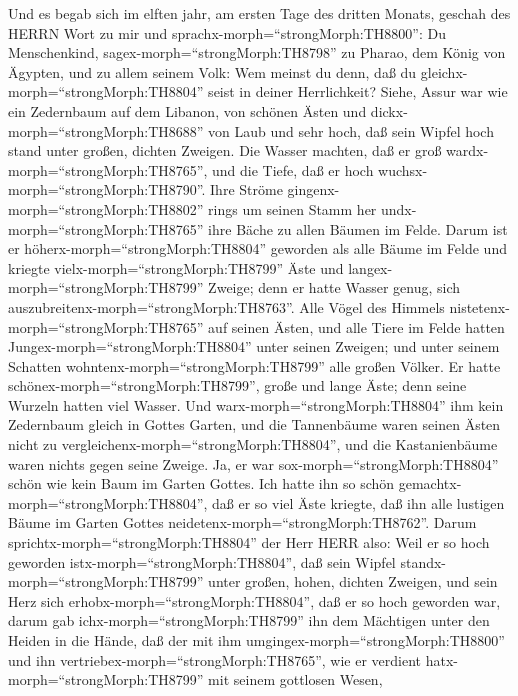  Und es begab sich im elften jahr, am ersten Tage des
dritten Monats, geschah des HERRN Wort zu mir und
sprachx-morph=``strongMorph:TH8800'':  Du Menschenkind,
sagex-morph=``strongMorph:TH8798'' zu Pharao, dem König von Ägypten, und
zu allem seinem Volk: Wem meinst du denn, daß du
gleichx-morph=``strongMorph:TH8804'' seist in deiner Herrlichkeit?
 Siehe, Assur war wie ein Zedernbaum auf dem Libanon, von
schönen Ästen und dickx-morph=``strongMorph:TH8688'' von Laub und sehr
hoch, daß sein Wipfel hoch stand unter großen, dichten Zweigen.
 Die Wasser machten, daß er groß
wardx-morph=``strongMorph:TH8765'', und die Tiefe, daß er hoch
wuchsx-morph=``strongMorph:TH8790''. Ihre Ströme
gingenx-morph=``strongMorph:TH8802'' rings um seinen Stamm her
undx-morph=``strongMorph:TH8765'' ihre Bäche zu allen Bäumen im Felde.
 Darum ist er höherx-morph=``strongMorph:TH8804'' geworden
als alle Bäume im Felde und kriegte vielx-morph=``strongMorph:TH8799''
Äste und langex-morph=``strongMorph:TH8799'' Zweige; denn er hatte
Wasser genug, sich auszubreitenx-morph=``strongMorph:TH8763''.
 Alle Vögel des Himmels
nistetenx-morph=``strongMorph:TH8765'' auf seinen Ästen, und alle Tiere
im Felde hatten Jungex-morph=``strongMorph:TH8804'' unter seinen
Zweigen; und unter seinem Schatten wohntenx-morph=``strongMorph:TH8799''
alle großen Völker.  Er hatte
schönex-morph=``strongMorph:TH8799'', große und lange Äste; denn seine
Wurzeln hatten viel Wasser.  Und
warx-morph=``strongMorph:TH8804'' ihm kein Zedernbaum gleich in Gottes
Garten, und die Tannenbäume waren seinen Ästen nicht zu
vergleichenx-morph=``strongMorph:TH8804'', und die Kastanienbäume waren
nichts gegen seine Zweige. Ja, er war sox-morph=``strongMorph:TH8804''
schön wie kein Baum im Garten Gottes.  Ich hatte ihn so
schön gemachtx-morph=``strongMorph:TH8804'', daß er so viel Äste
kriegte, daß ihn alle lustigen Bäume im Garten Gottes
neidetenx-morph=``strongMorph:TH8762''.  Darum
sprichtx-morph=``strongMorph:TH8804'' der Herr HERR also: Weil er so
hoch geworden istx-morph=``strongMorph:TH8804'', daß sein Wipfel
standx-morph=``strongMorph:TH8799'' unter großen, hohen, dichten
Zweigen, und sein Herz sich erhobx-morph=``strongMorph:TH8804'', daß er
so hoch geworden war,  darum gab
ichx-morph=``strongMorph:TH8799'' ihn dem Mächtigen unter den Heiden in
die Hände, daß der mit ihm umgingex-morph=``strongMorph:TH8800'' und ihn
vertriebex-morph=``strongMorph:TH8765'', wie er verdient
hatx-morph=``strongMorph:TH8799'' mit seinem gottlosen Wesen,
